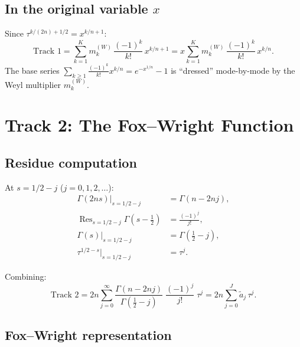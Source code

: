 \documentclass{article}
\newcommand{\Res}{\operatorname{Res}}
\begin{document}
\subsection{In the original variable $x$}

Since $\tau^{k/(2n)+1/2} = x^{k/n+1}$:
\begin{equation}\label{eq:track1-x}
\text{Track 1}
= \sum_{k=1}^K m_k^{(W)}\,\frac{(-1)^k}{k!}\,x^{k/n+1}
= x\sum_{k=1}^K m_k^{(W)}\,\frac{(-1)^k}{k!}\,x^{k/n}.
\end{equation}
The base series $\sum_{k\ge1}\frac{(-1)^k}{k!}x^{k/n} = e^{-x^{1/n}}-1$
is ``dressed'' mode-by-mode by the Weyl multiplier $m_k^{(W)}$.

\section{Track 2: The Fox--Wright Function}
\label{sec:track2}

\subsection{Residue computation}

At $s = 1/2-j$ ($j = 0,1,2,\ldots$):
\begin{align}
\Gamma(2ns)\big|_{s=1/2-j} &= \Gamma(n-2nj),\\[4pt]
\Res_{s=1/2-j}\Gamma(s-{\textstyle\frac12}) &= \frac{(-1)^j}{j!},\\[4pt]
\Gamma(s)\big|_{s=1/2-j} &= \Gamma({\textstyle\frac12}-j),\\[4pt]
\tau^{1/2-s}\big|_{s=1/2-j} &= \tau^j.
\end{align}

Combining:
\begin{equation}\label{eq:track2-series}
\text{Track 2} = 2n\sum_{j=0}^{\infty}
\frac{\Gamma(n-2nj)}{\Gamma(\tfrac{1}{2}-j)}\;\frac{(-1)^j}{j!}\;\tau^j
= 2n\sum_{j=0}^J \tilde{a}_j\,\tau^j.
\end{equation}

\subsection{Fox--Wright representation}
\end{document}
